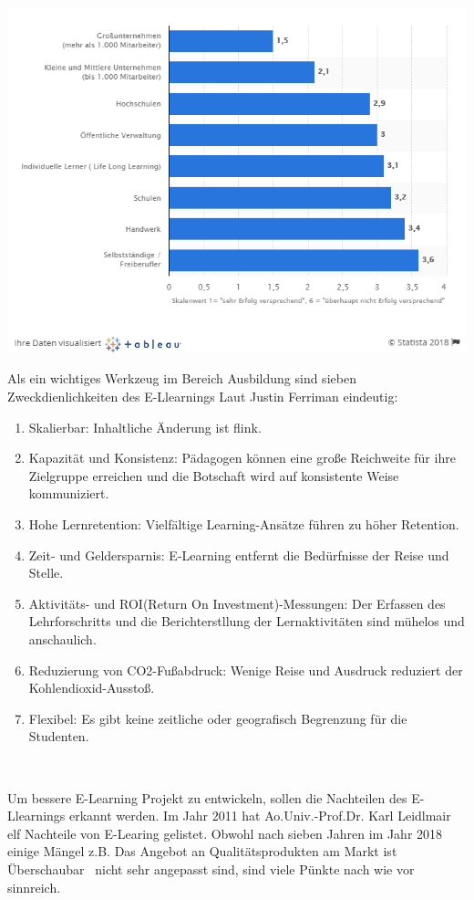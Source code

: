 \includegraphics[width=\textwidth]{images/zielgruppe.png}

Als ein wichtiges Werkzeug im Bereich Ausbildung sind sieben Zweckdienlichkeiten des E-Llearnings Laut Justin Ferriman \citep{6} eindeutig:

\begin{enumerate}
\item Skalierbar: Inhaltliche Änderung ist flink. 
\item Kapazität und Konsistenz: Pädagogen können eine große Reichweite für ihre Zielgruppe erreichen und die Botschaft wird auf konsistente Weise kommuniziert.
\item Hohe Lernretention: Vielfältige Learning-Ansätze führen zu höher Retention.
\item Zeit- und Geldersparnis: E-Learning entfernt die Bedürfnisse der Reise und Stelle.
\item Aktivitäts- und ROI(Return On Investment)-Messungen: Der Erfassen des Lehrforschritts und die Berichterstllung der Lernaktivitäten sind mühelos und anschaulich.
\item Reduzierung von CO2-Fußabdruck: Wenige Reise und Ausdruck reduziert der Kohlendioxid-Ausstoß.
\item Flexibel: Es gibt keine zeitliche oder geografisch Begrenzung für die Studenten.
\end{enumerate}\

Um bessere E-Learning Projekt zu entwickeln, sollen die Nachteilen des E-Llearnings erkannt werden. Im Jahr 2011 hat Ao.Univ.-Prof.Dr. Karl Leidlmair\citep{7} elf Nachteile von E-Learing gelistet. Obwohl nach sieben Jahren im Jahr 2018 einige Mängel z.B. \glqq Das Angebot an Qualitätsprodukten am Markt ist Überschaubar \grqq\ nicht sehr angepasst sind, sind viele Pünkte nach wie vor sinnreich.

